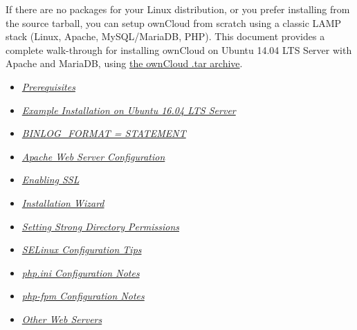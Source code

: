 \documentclass[letterpaper,10pt,english]{sphinxmanual}
\begin{document}
If there are no packages for your Linux distribution, or you prefer installing
from the source tarball, you can setup ownCloud from scratch using a classic
LAMP stack (Linux, Apache, MySQL/MariaDB, PHP). This document provides a
complete walk-through for installing ownCloud on Ubuntu 14.04 LTS Server with
Apache and MariaDB, using \href{https://owncloud.org/install/}{the ownCloud .tar archive}.
\begin{itemize}
\item {} 
{\hyperref[installation/source_installation:prerequisites-label]{\emph{Prerequisites}}}

\item {} 
{\hyperref[installation/source_installation:ubuntu-installation-label]{\emph{Example Installation on Ubuntu 16.04 LTS Server}}}

\item {} 
{\hyperref[installation/source_installation:binlog-format-label]{\emph{BINLOG\_FORMAT = STATEMENT}}}

\item {} 
{\hyperref[installation/source_installation:apache-configuration-label]{\emph{Apache Web Server Configuration}}}

\item {} 
{\hyperref[installation/source_installation:enabling-ssl-label]{\emph{Enabling SSL}}}

\item {} 
{\hyperref[installation/source_installation:installation-wizard-label]{\emph{Installation Wizard}}}

\item {} 
{\hyperref[installation/installation_wizard:strong-perms-label]{\emph{Setting Strong Directory Permissions}}}

\item {} 
{\hyperref[installation/source_installation:selinux-tips-label]{\emph{SELinux Configuration Tips}}}

\item {} 
{\hyperref[installation/source_installation:php-ini-tips-label]{\emph{php.ini Configuration Notes}}}

\item {} 
{\hyperref[installation/source_installation:php-fpm-tips-label]{\emph{php-fpm Configuration Notes}}}

\item {} 
{\hyperref[installation/source_installation:other-http-servers-label]{\emph{Other Web Servers}}}

\end{itemize}
\end{document}

